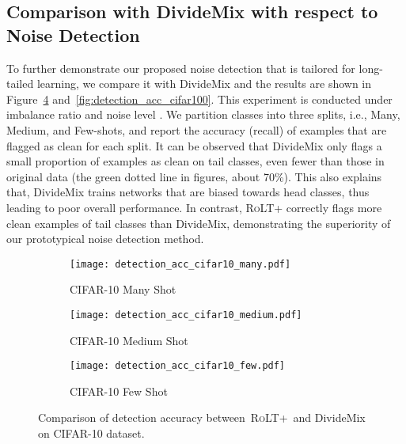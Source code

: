 \documentclass{article}
\def\algo{{\textsc{RoLT}}}
\begin{document}
\subsection{Comparison with DivideMix with respect to Noise Detection}
To further demonstrate our proposed noise detection that is tailored for long-tailed learning, we compare it with DivideMix and the results are shown in Figure~\ref{fig:detection_acc_cifar10} and~\ref{fig:detection_acc_cifar100}. This experiment is conducted under imbalance ratio  and noise level . We partition classes into three splits, i.e., Many, Medium, and Few-shots, and report the accuracy (recall) of examples that are flagged as clean for each split. It can be observed that DivideMix only flags a small proportion of examples as clean on tail classes, even fewer than those in original data (the green dotted line in figures, about 70\%). This also explains that, DivideMix trains networks that are biased towards head classes, thus leading to poor overall performance. In contrast, \algo+ correctly flags more clean examples of tail classes than DivideMix, demonstrating the superiority of our prototypical noise detection method.


\begin{figure}[!h]
    \centering
    \begin{subfigure}[b]{0.3\textwidth}
        \centering
        \texttt{[image: detection\_acc\_cifar10\_many.pdf]}
        \caption{CIFAR-10 Many Shot}
        \label{fig:detection_acc_cifar10_many}
    \end{subfigure}
    \begin{subfigure}[b]{0.3\textwidth}
        \centering
        \texttt{[image: detection\_acc\_cifar10\_medium.pdf]} 
        \caption{CIFAR-10 Medium Shot}
        \label{fig:detection_acc_cifar10_medium}
    \end{subfigure}
    \begin{subfigure}[b]{0.3\textwidth}
        \centering
        \texttt{[image: detection\_acc\_cifar10\_few.pdf]} 
        \caption{CIFAR-10 Few Shot}
        \label{fig:detection_acc_cifar10_few}
    \end{subfigure}
    \caption{Comparison of detection accuracy between~\algo+~and DivideMix on CIFAR-10 dataset.}
    \label{fig:detection_acc_cifar10}
\end{figure}
\end{document}
